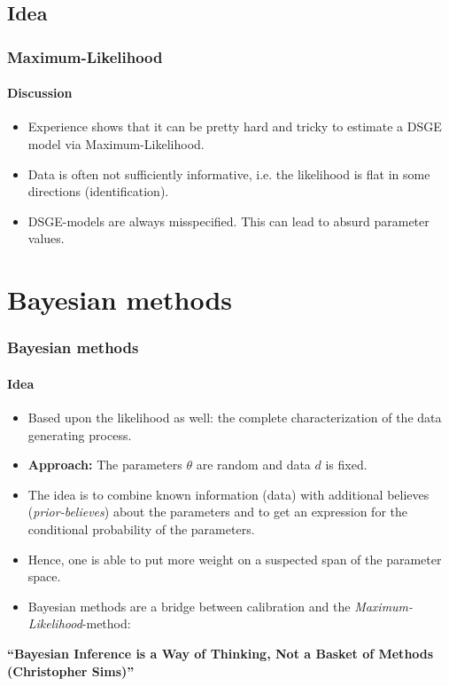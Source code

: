 \documentclass[handout]{beamer}  %
\begin{document}
\subsection{Idea}
\begin{frame}\frametitle{Maximum-Likelihood}\framesubtitle{Discussion}
\begin{itemize}
  \item Experience shows that it can be pretty hard and tricky to estimate a DSGE model via Maximum-Likelihood.
  \item Data is often not sufficiently informative, i.e. the likelihood is flat in some directions (identification).
  \item DSGE-models are always misspecified. This can lead to absurd parameter values.
\end{itemize}
\end{frame}
\section{Bayesian methods}
\begin{frame}\frametitle{Bayesian methods}\framesubtitle{Idea}
\begin{itemize}
  \item Based upon the likelihood as well: the complete characterization of the data generating process.
  \item \textbf{Approach:} The parameters ${\theta}$ are random and data ${d}$ is fixed.
  \item The idea is to combine known information (data) with additional believes (\emph{prior-believes}) about the parameters and to get an expression for the conditional probability of the parameters.
  \item Hence, one is able to put more weight on a suspected span of the parameter space.
  \item Bayesian methods are a bridge between calibration and the \emph{Maximum-Likelihood}-method:
\end{itemize}
\textbf{\enquote{Bayesian Inference is a Way of Thinking, Not a Basket of Methods (Christopher Sims)}}
\end{frame}
\end{document}
